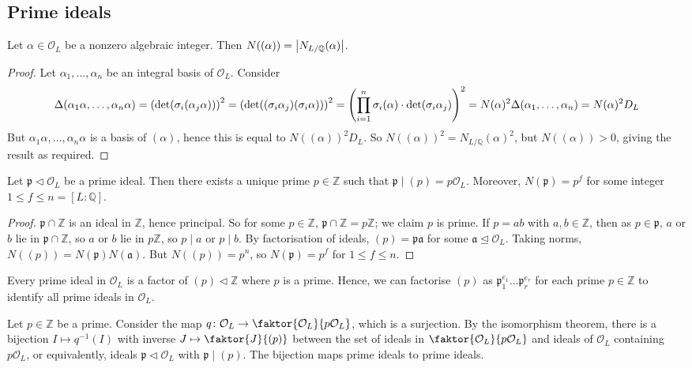 \subsection{Prime ideals}
\begin{lemma}
    Let \( \alpha \in \mathcal O_L \) be a nonzero algebraic integer.
    Then \( N((\alpha)) = \abs{N_{L/\mathbb Q}(\alpha)} \).
\end{lemma}
\begin{proof}
    Let \( \alpha_1, \dots, \alpha_n \) be an integral basis of \( \mathcal O_L \).
    Consider
    \[ \Delta(\alpha_1\alpha, \dots, \alpha_n\alpha) = \qty(\det(\sigma_i (\alpha_j \alpha)))^2 = \qty(\det((\sigma_i \alpha_j)(\sigma_i \alpha)))^2 = \qty(\prod_{i=1}^n \sigma_i(\alpha) \cdot \det (\sigma_i \alpha_j))^2 = N(\alpha)^2 \Delta(\alpha_1, \dots, \alpha_n) = N(\alpha)^2 D_L \]
    But \( \alpha_1\alpha, \dots, \alpha_n\alpha \) is a basis of \( (\alpha) \), hence this is equal to \( N((\alpha))^2 D_L \).
    So \( N((\alpha))^2 = N_{L/\mathbb Q}(\alpha)^2 \), but \( N((\alpha)) > 0 \), giving the result as required.
\end{proof}
\begin{lemma}
    Let \( \mathfrak p \triangleleft \mathcal O_L \) be a prime ideal.
    Then there exists a unique prime \( p \in \mathbb Z \) such that \( \mathfrak p \mid (p) = p\mathcal O_L \).
    Moreover, \( N(\mathfrak p) = p^f \) for some integer \( 1 \leq f \leq n = [L:\mathbb Q] \).
\end{lemma}
\begin{proof}
    \( \mathfrak p \cap \mathbb Z \) is an ideal in \( \mathbb Z \), hence principal.
    So for some \( p \in \mathbb Z \), \( \mathfrak p \cap \mathbb Z = p \mathbb Z \); we claim \( p \) is prime.
    If \( p = ab \) with \( a, b \in \mathbb Z \), then as \( p \in \mathfrak p \), \( a \) or \( b \) lie in \( \mathfrak p \cap \mathbb Z \), so \( a \) or \( b \) lie in \( p \mathbb Z \), so \( p \mid a \) or \( p \mid b \).
    By factorisation of ideals, \( (p) = \mathfrak p \mathfrak a \) for some \( \mathfrak a \trianglelefteq \mathcal O_L \).
    Taking norms, \( N((p)) = N(\mathfrak p) N(\mathfrak a) \).
    But \( N((p)) = p^n \), so \( N(\mathfrak p) = p^f \) for \( 1 \leq f \leq n \).
\end{proof}
\begin{remark}
    Every prime ideal in \( \mathcal O_L \) is a factor of \( (p) \triangleleft \mathbb Z \) where \( p \) is a prime.
    Hence, we can factorise \( (p) \) as \( \mathfrak p_1^{e_1} \dots \mathfrak p_r^{e_r} \) for each prime \( p \in \mathbb Z \) to identify all prime ideals in \( \mathcal O_L \).
\end{remark}
Let \( p \in \mathbb Z \) be a prime.
Consider the map \( q \colon \mathcal O_L \to \faktor{\mathcal O_L}{p\mathcal O_L} \), which is a surjection.
By the isomorphism theorem, there is a bijection \( I \mapsto q^{-1}(I) \) with inverse \( J \mapsto \faktor{J}{(p)} \) between the set of ideals in \( \faktor{\mathcal O_L}{p\mathcal O_L} \) and ideals of \( \mathcal O_L \) containing \( p\mathcal O_L \), or equivalently, ideals \( \mathfrak p \triangleleft \mathcal O_L \) with \( \mathfrak p \mid (p) \).
The bijection maps prime ideals to prime ideals.

